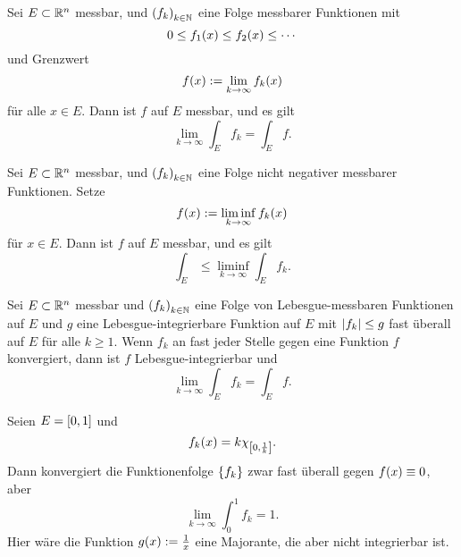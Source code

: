 \begin{proposition}\label{proposition:16}
	Sei \(E \subset \R^n\) messbar, und \(\parentheses*{f_k}_{k \in \N}\) eine Folge messbarer Funktionen mit
	\begin{equation}
		0 \le f_1\parentheses*{x} \le f_2\parentheses*{x} \le \cdots
	\end{equation}
	und Grenzwert
	\begin{equation}
		f\parentheses*{x} := \lim_{k \to \infty}f_k\parentheses*{x}
	\end{equation}
	für alle \(x \in E\).
	Dann ist \(f\) auf \(E\) messbar, und es gilt
	\begin{equation}\label{equation:26}
		\lim_{k \to \infty}\int_E f_k = \int_E f.
	\end{equation}
\end{proposition}

\begin{lemma}\label{lemma:17}
	Sei \(E \subset \R^n\) messbar, und \(\parentheses*{f_k}_{k \in \N}\) eine Folge nicht negativer messbarer Funktionen.
	Setze
	\begin{equation}
		f\parentheses*{x} := \liminf_{k \to \infty}f_k\parentheses*{x}
	\end{equation}
	für \(x \in E\).
	Dann ist \(f\) auf \(E\) messbar, und es gilt
	\begin{equation}
		\int_E \le \liminf_{k \to \infty}\int_E f_k.
	\end{equation}
\end{lemma}

\begin{proposition}
	Sei \(E \subset \R^n\) messbar und \(\parentheses*{f_k}_{k \in \N}\) eine Folge von Lebesgue-messbaren Funktionen auf \(E\) und \(g\) eine Lebesgue-integrierbare Funktion auf \(E\) mit \(\absolute*{f_k} \le g\) fast überall auf \(E\) für alle \(k \ge 1\).
	Wenn \(f_k\) an fast jeder Stelle gegen eine Funktion \(f\) konvergiert, dann ist \(f\) Lebesgue-integrierbar und
	\begin{equation}
		\lim_{k \to \infty}\int_E f_k = \int_E f.
	\end{equation}
\end{proposition}

\begin{example}
	Seien \(E = \brackets*{0, 1}\) und
	\[
		f_k\parentheses*{x} = k\chi_{\brackets*{0, \frac{1}{k}}}.
	\]
	Dann konvergiert die Funktionenfolge \(\braces*{f_k}\) zwar fast überall gegen \(f\parentheses*{x} \equiv 0\), aber
	\[
		\lim_{k \to \infty}\int_0^1 f_k = 1.
	\]
	Hier wäre die Funktion \(g\parentheses*{x} := \frac{1}{x}\) eine Majorante, die aber nicht integrierbar ist.
\end{example}

